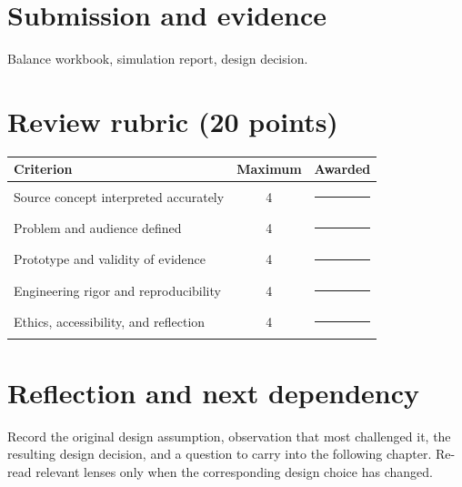 \documentclass[11pt]{article}
\begin{document}
\section{Submission and evidence}
Balance workbook, simulation report, design decision.


\section{Review rubric (20 points)}
\begin{tabularx}{\linewidth}{@{}Xcc@{}}\toprule
Criterion & Maximum & Awarded \\ \midrule
Source concept interpreted accurately & 4 & \rule{0.45in}{0.4pt}\\
Problem and audience defined & 4 & \rule{0.45in}{0.4pt}\\
Prototype and validity of evidence & 4 & \rule{0.45in}{0.4pt}\\
Engineering rigor and reproducibility & 4 & \rule{0.45in}{0.4pt}\\
Ethics, accessibility, and reflection & 4 & \rule{0.45in}{0.4pt}\\\bottomrule
\end{tabularx}

\section{Reflection and next dependency}
Record the original design assumption, observation that most challenged it, the resulting design decision, and a question to carry into the following chapter. Re-read relevant lenses only when the corresponding design choice has changed.
\end{document}
